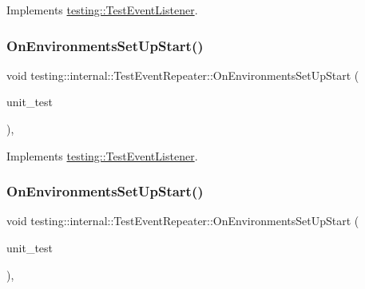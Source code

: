 Implements \mbox{\hyperlink{classtesting_1_1_test_event_listener_aa6502e534919605be45f26a6daf9a40c}{testing\+::\+Test\+Event\+Listener}}.

\mbox{\label{classtesting_1_1internal_1_1_test_event_repeater_a739b5fd1f5bcb96b42089ff06281b3ea}} 
\subsubsection{\texorpdfstring{OnEnvironmentsSetUpStart()}{OnEnvironmentsSetUpStart()}\hspace{0.1cm}{\footnotesize\ttfamily [2/3]}}
{\footnotesize\ttfamily void testing\+::internal\+::\+Test\+Event\+Repeater\+::\+On\+Environments\+Set\+Up\+Start (\begin{DoxyParamCaption}\item[{const \mbox{\hyperlink{classtesting_1_1_unit_test}{Unit\+Test}} \&}]{unit\+\_\+test }\end{DoxyParamCaption})\hspace{0.3cm}{\ttfamily [override]}, {\ttfamily [virtual]}}



Implements \mbox{\hyperlink{classtesting_1_1_test_event_listener_aa6502e534919605be45f26a6daf9a40c}{testing\+::\+Test\+Event\+Listener}}.

\mbox{\label{classtesting_1_1internal_1_1_test_event_repeater_a739b5fd1f5bcb96b42089ff06281b3ea}} 
\subsubsection{\texorpdfstring{OnEnvironmentsSetUpStart()}{OnEnvironmentsSetUpStart()}\hspace{0.1cm}{\footnotesize\ttfamily [3/3]}}
{\footnotesize\ttfamily void testing\+::internal\+::\+Test\+Event\+Repeater\+::\+On\+Environments\+Set\+Up\+Start (\begin{DoxyParamCaption}\item[{const \mbox{\hyperlink{classtesting_1_1_unit_test}{Unit\+Test}} \&}]{unit\+\_\+test }\end{DoxyParamCaption})\hspace{0.3cm}{\ttfamily [override]}, {\ttfamily [virtual]}}



